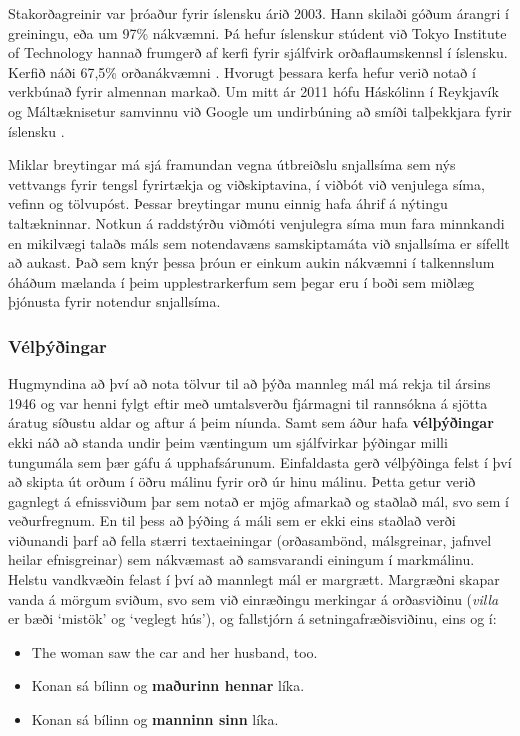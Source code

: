 \begin{multicols}{2}
Stakorðagreinir var þróaður fyrir íslensku árið 2003. Hann skilaði góðum árangri í greiningu, eða um 97\% nákvæmni. Þá hefur íslenskur stúdent við Tokyo Institute of Technology hannað frumgerð af kerfi fyrir sjálfvirk orðaflaumskennsl í íslensku. Kerfið náði 67,5\% orðanákvæmni \cite{hind1}. Hvorugt þessara kerfa hefur verið notað í verkbúnað fyrir almennan markað. Um mitt ár 2011 hófu Háskólinn í Reykjavík og Máltæknisetur samvinnu við Google um undirbúning að smíði talþekkjara fyrir íslensku \cite{alm1}.

Miklar breytingar má sjá framundan vegna útbreiðslu snjallsíma sem nýs vettvangs fyrir tengsl fyrirtækja og viðskiptavina, í viðbót við venjulega síma, vefinn og tölvupóst. Þessar breytingar munu einnig hafa áhrif á nýtingu taltækninnar. Notkun á raddstýrðu viðmóti venjulegra síma mun fara minnkandi en mikilvægi talaðs máls sem notendavæns samskiptamáta við snjallsíma er sífellt að aukast. Það sem knýr þessa þróun er einkum aukin nákvæmni í talkennslum óháðum mælanda í þeim upplestrarkerfum sem þegar eru í boði sem miðlæg þjónusta fyrir notendur snjallsíma.

\subsubsection{Vélþýðingar}

Hugmyndina að því að nota tölvur til að þýða mannleg mál má rekja til ársins 1946 og var henni fylgt eftir með umtalsverðu fjármagni til rannsókna á sjötta áratug síðustu aldar og aftur á þeim níunda. Samt sem áður hafa \textbf{vélþýðingar} ekki náð að standa undir þeim væntingum um sjálfvirkar þýðingar milli tungumála sem þær gáfu á upphafsárunum.
Einfaldasta gerð vélþýðinga felst í því að skipta út orðum í öðru málinu fyrir orð úr hinu málinu. Þetta getur verið gagnlegt á efnissviðum þar sem notað er mjög afmarkað og staðlað mál, svo sem í veðurfregnum. En til þess að þýðing á máli sem er ekki eins staðlað verði viðunandi þarf að fella stærri textaeiningar (orðasambönd, málsgreinar, jafnvel heilar efnisgreinar) sem nákvæmast að samsvarandi einingum í markmálinu. Helstu vandkvæðin felast í því að mannlegt mál er margrætt. Margræðni skapar vanda á mörgum sviðum, svo sem við einræðingu merkingar á orðasviðinu (\textit{villa} er bæði ‘mistök’ og ‘veglegt hús’), og fallstjórn á setningafræðisviðinu, eins og í:

\begin{itemize}
\item The woman saw the car and her husband, too.
\item Konan sá bílinn og \textbf{maðurinn hennar} líka.
\item Konan sá bílinn og \textbf{manninn sinn} líka.
\end{itemize}


\end{multicols}
